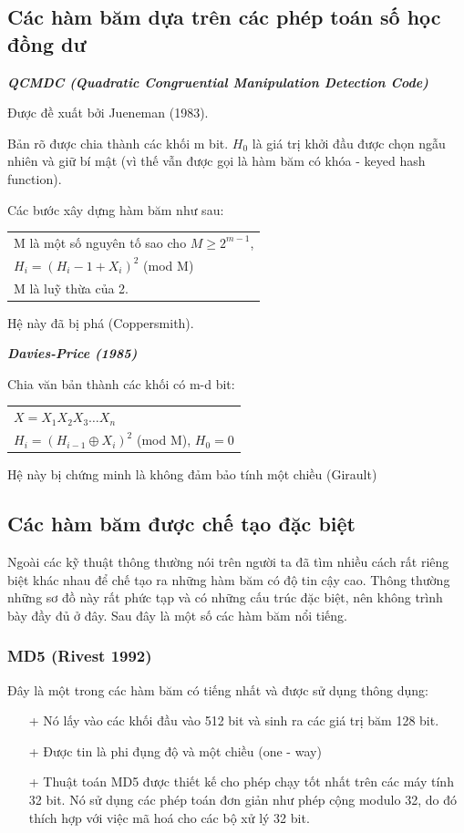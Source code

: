 \documentclass[a4paper,12pt]{report}
\begin{document}
\subsection*{Các hàm băm dựa trên các phép toán số học đồng dư}
\textbf{\textit{QCMDC (Quadratic Congruential Manipulation Detection Code)}}

Được đề xuất bởi Jueneman (1983).

Bản rõ được chia thành các khối m bit. $H_0$ là giá trị khởi đầu được chọn ngẫu nhiên và giữ bí mật (vì thế vẫn được gọi là hàm băm có khóa - keyed hash function).

Các bước xây dựng hàm băm như sau:
\begin{center}
\begin{tabular}{l}
M là một số nguyên tố sao cho $M \geq 2^{m-1}$, \\ 
$H_i = (H_i - 1 + X_i)^2$ (mod M) \\
M là luỹ thừa của 2.
\end{tabular}
\end{center}

Hệ này đã bị phá (Coppersmith).

\textbf{\textit{Davies-Price (1985)}}

Chia văn bản thành các khối có m-d bit:
\begin{center}
\begin{tabular}{l}
$X = X_1 X_2 X_3 \ldots X_n$ \\
$H_i = (H_{i-1} \oplus X_i)^2$ (mod M), $H_0 = 0$
\end{tabular}
\end{center}

Hệ này bị chứng minh là không đảm bảo tính một chiều (Girault)

\subsection*{Các hàm băm được chế tạo đặc biệt}
Ngoài các kỹ thuật thông thường nói trên người ta đã tìm nhiều cách rất riêng biệt khác nhau để chế tạo ra những hàm băm có độ tin cậy cao. Thông thường những sơ đồ này rất phức tạp và có những cấu trúc đặc biệt, nên không trình bày đầy đủ ở đây. Sau đây là một số các hàm băm nổi tiếng.
\subsubsection{MD5  (Rivest 1992)}
Đây là một trong các hàm băm có tiếng nhất và được sử dụng thông dụng:
\begin{itemize}
\item[+] Nó lấy vào các khối đầu vào 512 bit và sinh ra các giá trị băm 128 bit.
\item[+] Được tin là phi đụng độ và một chiều (one - way)
\item[+] Thuật toán MD5 được thiết kế cho phép chạy tốt nhất trên các máy tính 32 bit. Nó sử dụng các phép toán đơn giản như phép cộng modulo 32, do đó thích hợp với việc mã hoá cho các bộ xử lý 32 bit.
\end{itemize}
\end{document}

